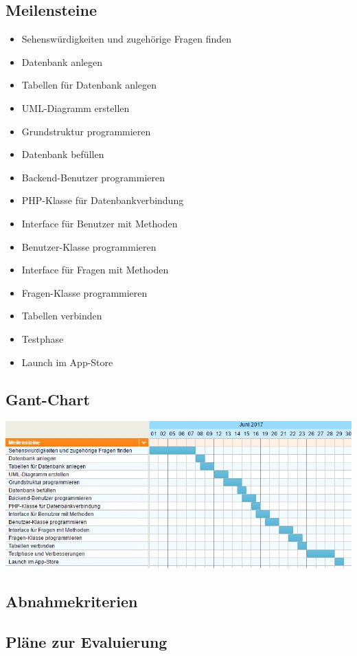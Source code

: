 \subsection{Meilensteine}
\begin{itemize}
	\item Sehenswürdigkeiten und zugehörige Fragen finden
	\item Datenbank anlegen
	\item Tabellen für Datenbank anlegen
	\item UML-Diagramm erstellen
	\item Grundstruktur programmieren
	\item Datenbank befüllen
	\item Backend-Benutzer programmieren
	\item PHP-Klasse für Datenbankverbindung
	\item Interface für Benutzer mit Methoden
	\item Benutzer-Klasse programmieren
	\item Interface für Fragen mit Methoden
	\item Fragen-Klasse programmieren
	\item Tabellen verbinden
	\item Testphase
	\item Launch im App-Store
\end{itemize}
\subsection{Gant-Chart}
\includegraphics[width=15cm]{meilensteine}\\
\subsection{Abnahmekriterien}
\subsection{Pläne zur Evaluierung}
